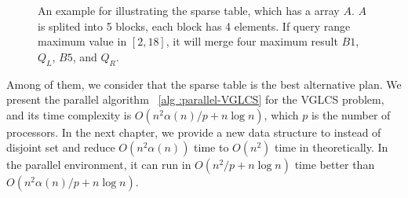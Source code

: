 \begin{figure*}[!thb]
  \centering

  \caption{  
An example for illustrating the sparse table, which has
a array $A$. $A$ is splited into 5 blocks, each block has 4 elements.
If query range maximum value in $[2, 18]$, it will merge four maximum
result $B1$, $Q_L$, $B5$, and $Q_R$.   
}

  \label{fig:interval-decomposition}
\end{figure*}

Among of them, we consider that the sparse table is the best
alternative plan.  We present the parallel algorithm ~\ref{alg
:parallel-VGLCS} for the VGLCS problem, and its time complexity is
$O(n^2 \alpha(n) / p + n \log n)$, which $p$ is the number of
processors. In the next chapter, we provide a new data structure to
instead of disjoint set and reduce $O(n^2 \alpha(n))$ time to $O(n^2)$
time in theoretically.  In the parallel environment, it can run in
$O(n^2 /p + n \log n)$ time better than $O(n^2 \alpha(n)/p + n \log
n)$.

